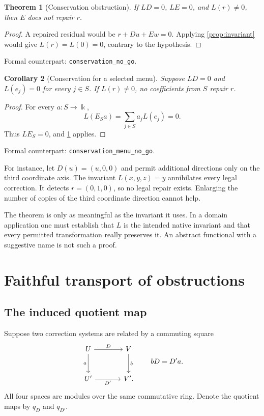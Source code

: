 \documentclass[11pt,letterpaper,oneside,openany]{book}
\theoremstyle{quiet}
\newtheorem{theorem}{Theorem}[chapter]
\newtheorem{corollary}[theorem]{Corollary}
\newcommand{\kk}{\Bbbk}
\newcommand{\formal}[1]{\par\nobreak\begingroup\footnotesize\color{Slate}\sffamily Formal counterpart: \normalfont\nolinkurl{#1}.\par\endgroup}
\begin{document}
\begin{theorem}[Conservation obstruction]\label{thm:conservation}
If $LD=0$, $LE=0$, and $L(r)\ne0$, then $E$ does not repair $r$.
\end{theorem}
\begin{proof}
A repaired residual would be $r+Du+Ew=0$. Applying \cref{prop:invariant} would give $L(r)=L(0)=0$, contrary to the hypothesis.
\end{proof}
\formal{conservation_no_go}

\begin{corollary}[Conservation for a selected menu]\label{cor:menu-conservation}
Suppose $LD=0$ and $L(e_j)=0$ for every $j\in S$. If $L(r)\ne0$, no coefficients from $S$ repair $r$.
\end{corollary}
\begin{proof}
For every $a:S\to\kk$,
\[
L(E_Sa)=\sum_{j\in S}a_jL(e_j)=0.
\]
Thus $LE_S=0$, and \cref{thm:conservation} applies.
\end{proof}
\formal{conservation_menu_no_go}

For instance, let $D(u)=(u,0,0)$ and permit additional directions only on the third coordinate axis. The invariant $L(x,y,z)=y$ annihilates every legal correction. It detects $r=(0,1,0)$, so no legal repair exists. Enlarging the number of copies of the third coordinate direction cannot help.

The theorem is only as meaningful as the invariant it uses. In a domain application one must establish that $L$ is the intended native invariant and that every permitted transformation really preserves it. An abstract functional with a suggestive name is not such a proof.

\chapter{Faithful transport of obstructions}\label{ch:transport}
\section{The induced quotient map}
Suppose two correction systems are related by a commuting square
\begin{equation}\label{eq:square}
\begin{tikzcd}[column sep=large,row sep=large]
U \arrow[r,"D"] \arrow[d,"a"'] & V \arrow[d,"b"]\\
U' \arrow[r,"D'"'] & V'.
\end{tikzcd}
\qquad bD=D'a.
\end{equation}
All four spaces are modules over the same commutative ring. Denote the quotient maps by $q_D$ and $q_{D'}$.
\end{document}
